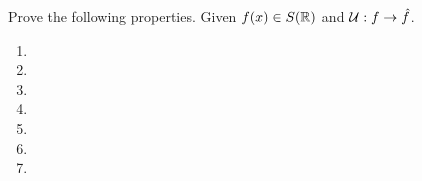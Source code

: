 Prove the following properties. Given $f(x) \in S(\mathbb{R})$ and $\mathcal{U}: f \to \hat{f}$.

\begin{enumerate}
\item 
\item 
\item 
\item 
\item 
\item 
\item 
\end{enumerate}
